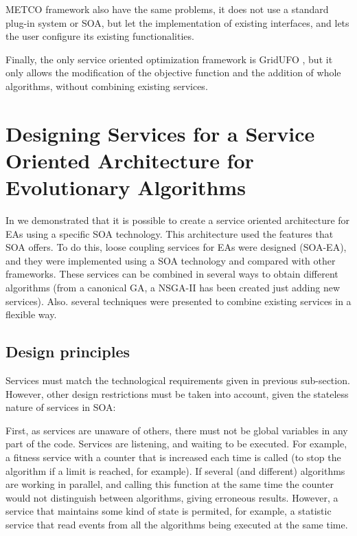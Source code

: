 \documentclass{sig-alternate}
\begin{document}
METCO framework \cite{METCO} also have the same problems, it does not use a standard plug-in system or SOA, but let the implementation of existing interfaces, and lets the user configure its existing functionalities.

Finally, the only service oriented optimization framework is GridUFO \cite{GRIDUFO}, but it only allows the modification of the objective function and the addition of whole algorithms, without combining existing services. 

\section{Designing Services for a Service Oriented Architecture for Evolutionary Algorithms}
\label{sec:design}
In \cite{OSGILIATH} we demonstrated that it is possible to create a service oriented architecture for EAs using a specific SOA technology. This architecture used the features that SOA offers. To do this, loose coupling services for EAs were designed (SOA-EA), and they were implemented using a SOA technology and compared with other frameworks. These services can be combined in several ways to obtain different algorithms (from a canonical GA, a NSGA-II has been created just adding new services). Also. several techniques were presented to combine existing services in a flexible way.



\subsection{Design principles}

Services must match the technological requirements given in previous sub-section. However, other design restrictions must be taken into account, given the stateless nature of services in SOA:

First, as services are unaware of others, there must not be global variables in any part of the code. Services are listening, and waiting to be executed. For example, a fitness service with a counter that is increased each time is called (to stop the algorithm if a limit is reached, for example). If several (and different) algorithms are working in parallel, and calling this function at the same time the counter would not distinguish between algorithms, giving erroneous results. However, a service that maintains some kind of state is permited, for example, a statistic service that read events from all the algorithms being executed at the same time.
\end{document}
